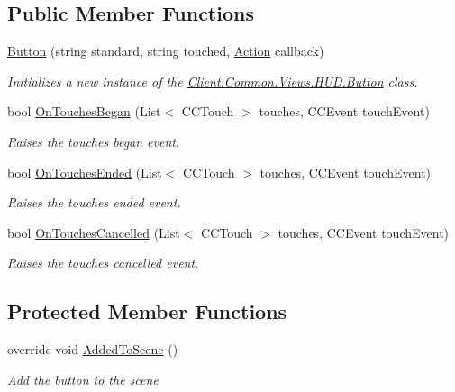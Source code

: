 \subsection*{Public Member Functions}
\begin{DoxyCompactItemize}
\item 
\hyperlink{classClient_1_1Common_1_1Views_1_1HUD_1_1Button_acb4ae1bf0e725bbe50627ea3d434a52b}{Button} (string standard, string touched, \hyperlink{classCore_1_1Controllers_1_1Actions_1_1Action}{Action} callback)
\begin{DoxyCompactList}\small\item\em Initializes a new instance of the \hyperlink{classClient_1_1Common_1_1Views_1_1HUD_1_1Button}{Client.\+Common.\+Views.\+H\+U\+D.\+Button} class. \end{DoxyCompactList}\item 
bool \hyperlink{classClient_1_1Common_1_1Views_1_1HUD_1_1Button_a0dd1915cce97f7222490e73b03dbd118}{On\+Touches\+Began} (List$<$ C\+C\+Touch $>$ touches, C\+C\+Event touch\+Event)
\begin{DoxyCompactList}\small\item\em Raises the touches began event. \end{DoxyCompactList}\item 
bool \hyperlink{classClient_1_1Common_1_1Views_1_1HUD_1_1Button_a2af760a070290cacdc7bcc4c3a9647e9}{On\+Touches\+Ended} (List$<$ C\+C\+Touch $>$ touches, C\+C\+Event touch\+Event)
\begin{DoxyCompactList}\small\item\em Raises the touches ended event. \end{DoxyCompactList}\item 
bool \hyperlink{classClient_1_1Common_1_1Views_1_1HUD_1_1Button_a9292d69f422c1509cbf860ef54f2c5c3}{On\+Touches\+Cancelled} (List$<$ C\+C\+Touch $>$ touches, C\+C\+Event touch\+Event)
\begin{DoxyCompactList}\small\item\em Raises the touches cancelled event. \end{DoxyCompactList}\end{DoxyCompactItemize}
\subsection*{Protected Member Functions}
\begin{DoxyCompactItemize}
\item 
override void \hyperlink{classClient_1_1Common_1_1Views_1_1HUD_1_1Button_a96e98d2a692051646e4a70b0b1450227}{Added\+To\+Scene} ()
\begin{DoxyCompactList}\small\item\em Add the button to the scene \end{DoxyCompactList}\end{DoxyCompactItemize}
